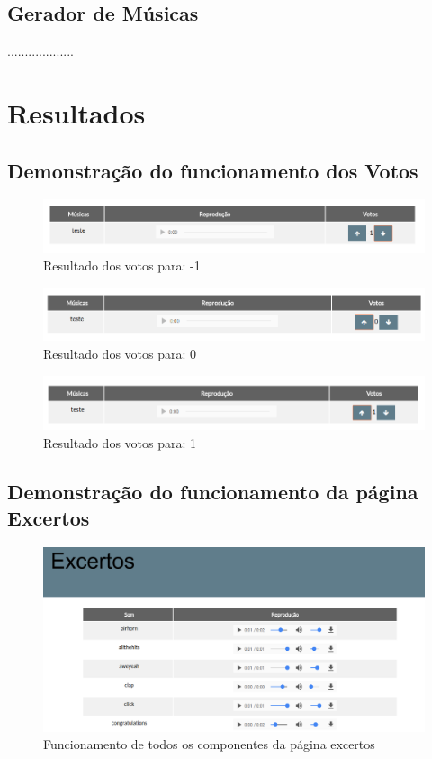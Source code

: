 \documentclass{report}
\begin{document}
\newpage
\section{Gerador de Músicas}
\label{chap.gerador}
...................
\newpage
\chapter{Resultados}
\label{resultados}

\section{Demonstração do funcionamento dos Votos}
\begin{figure} [h]
	\centering
	\includegraphics [scale = 0.4] {img/votos-1}
	\caption{Resultado dos votos para: -1}
\end{figure}

\begin{figure} [h]
	\centering
	\includegraphics [scale = 0.4] {img/votos0}
	\caption{Resultado dos votos para: 0}
\end{figure}

\begin{figure} [h]
	\centering
	\includegraphics [scale = 0.4] {img/votos1}
	\caption{Resultado dos votos para: 1}
\end{figure}

\section{Demonstração do funcionamento da página Excertos}
\begin{figure} [h]
	\centering
	\includegraphics [scale = 0.3] {img/excertos}
	\caption{Funcionamento de todos os componentes da página excertos}
\end{figure}
\end{document}
